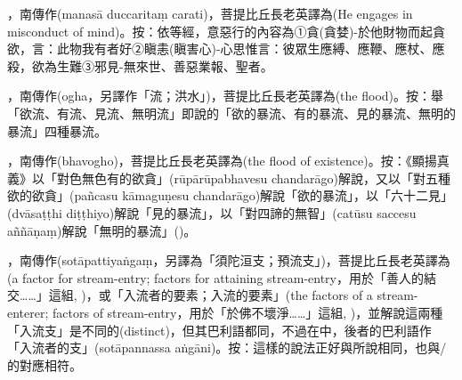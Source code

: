 \startitemgroup[noteitems]
\item{}，南傳作(manasā duccaritaṃ carati)，菩提比丘長老英譯為(He engages in misconduct of mind)。按：依等經，意惡行的內容為①貪(貪婪)-於他財物而起貪欲，言：此物我有者好②瞋恚(瞋害心)-心思惟言：彼眾生應縛、應鞭、應杖、應殺，欲為生難③邪見-無來世、善惡業報、聖者。
\stopitemgroup

\startitemgroup[noteitems]
\item{}，南傳作(ogha，另譯作「流；洪水」)，菩提比丘長老英譯為(the flood)。按：舉「欲流、有流、見流、無明流」即說的「欲的暴流、有的暴流、見的暴流、無明的暴流」四種暴流。
\item{}，南傳作(bhavogho)，菩提比丘長老英譯為(the flood of existence)。按：《顯揚真義》以「對色無色有的欲貪」(rūpārūpabhavesu chandarāgo)解說，又以「對五種欲的欲貪」(pañcasu kāmaguṇesu chandarāgo)解說「欲的暴流」，以「六十二見」(dvāsaṭṭhi diṭṭhiyo)解說「見的暴流」，以「對四諦的無智」(catūsu saccesu aññāṇaṃ)解說「無明的暴流」()。
\stopitemgroup

\startitemgroup[noteitems]
\item{}，南傳作(sotāpattiyaṅgaṃ，另譯為「須陀洹支；預流支」)，菩提比丘長老英譯為(a factor for stream-entry; factors for attaining stream-entry，用於「善人的結交……」這組, )，或「入流者的要素；入流的要素」(the factors of a stream-enterer; factors of stream-entry，用於「於佛不壞淨……」這組, )，並解說這兩種「入流支」是不同的(distinct)，但其巴利語都同，不過在中，後者的巴利語作「入流者的支」(sotāpannassa aṅgāni)。按：這樣的說法正好與所說相同，也與/的對應相符。
\stopitemgroup

